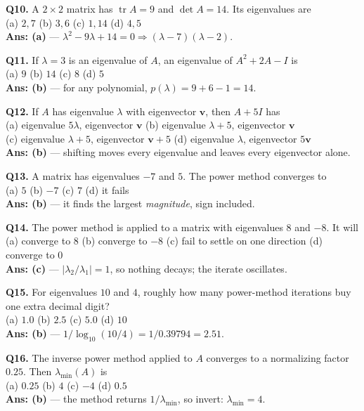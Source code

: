 \begin{mcqbox}
\textbf{Q10.} A $2\times2$ matrix has $\operatorname{tr}A = 9$ and $\det A = 14$. Its eigenvalues are\\
(a) $2, 7$ \quad (b) $3, 6$ \quad (c) $1, 14$ \quad (d) $4, 5$\\
\textbf{Ans: (a)} --- $\lambda^2-9\lambda+14 = 0 \Rightarrow (\lambda-7)(\lambda-2)$.

\textbf{Q11.} If $\lambda = 3$ is an eigenvalue of $A$, an eigenvalue of $A^2 + 2A - I$ is\\
(a) $9$ \quad (b) $14$ \quad (c) $8$ \quad (d) $5$\\
\textbf{Ans: (b)} --- for any polynomial, $p(\lambda) = 9+6-1 = 14$.

\textbf{Q12.} If $A$ has eigenvalue $\lambda$ with eigenvector $\mathbf v$, then $A + 5I$ has\\
(a) eigenvalue $5\lambda$, eigenvector $\mathbf v$ \quad (b) eigenvalue $\lambda+5$, eigenvector $\mathbf v$\\
(c) eigenvalue $\lambda+5$, eigenvector $\mathbf v+5$ \quad (d) eigenvalue $\lambda$, eigenvector $5\mathbf v$\\
\textbf{Ans: (b)} --- shifting moves every eigenvalue and leaves every eigenvector alone.

\textbf{Q13.} A matrix has eigenvalues $-7$ and $5$. The power method converges to\\
(a) $5$ \quad (b) $-7$ \quad (c) $7$ \quad (d) it fails\\
\textbf{Ans: (b)} --- it finds the largest \emph{magnitude}, sign included.

\textbf{Q14.} The power method is applied to a matrix with eigenvalues $8$ and $-8$. It will\\
(a) converge to $8$ \quad (b) converge to $-8$ \quad (c) fail to settle on one direction \quad (d) converge to $0$\\
\textbf{Ans: (c)} --- $|\lambda_2/\lambda_1| = 1$, so nothing decays; the iterate oscillates.

\textbf{Q15.} For eigenvalues $10$ and $4$, roughly how many power-method iterations buy one extra decimal digit?\\
(a) $1.0$ \quad (b) $2.5$ \quad (c) $5.0$ \quad (d) $10$\\
\textbf{Ans: (b)} --- $1/\log_{10}(10/4) = 1/0.39794 = 2.51$.

\textbf{Q16.} The inverse power method applied to $A$ converges to a normalizing factor $0.25$. Then $\lambda_{\min}(A)$ is\\
(a) $0.25$ \quad (b) $4$ \quad (c) $-4$ \quad (d) $0.5$\\
\textbf{Ans: (b)} --- the method returns $1/\lambda_{\min}$, so invert: $\lambda_{\min} = 4$.


\end{mcqbox}
